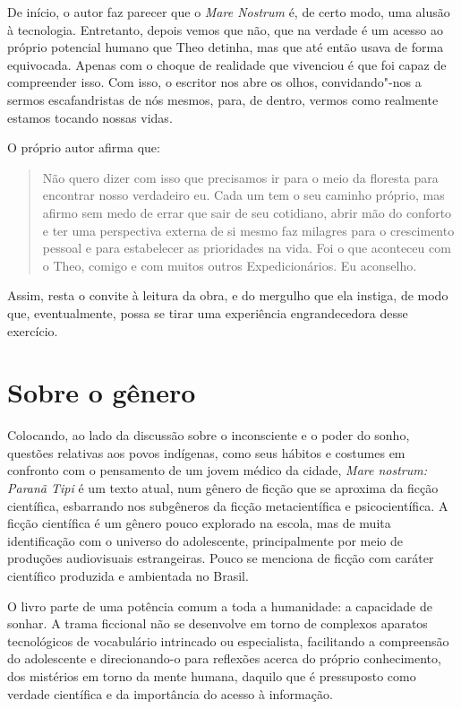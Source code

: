 De início, o autor faz parecer que o \textit{Mare Nostrum} é, de certo modo, uma
alusão à tecnologia. Entretanto, depois vemos que não, que na verdade é
um acesso ao próprio potencial humano que Theo detinha, mas que até
então usava de forma equivocada. Apenas com o choque de realidade que
vivenciou é que foi capaz de compreender isso. Com isso, o escritor nos
abre os olhos, convidando"-nos a sermos escafandristas de nós mesmos,
para, de dentro, vermos como realmente estamos tocando nossas vidas.

O próprio autor afirma que:

\begin{quote}
Não quero dizer com isso que precisamos ir para o meio da floresta para
encontrar nosso verdadeiro eu. Cada um tem o seu caminho próprio, mas
afirmo sem medo de errar que sair de seu cotidiano, abrir mão do
conforto e ter uma perspectiva externa de si mesmo faz milagres para o
crescimento pessoal e para estabelecer as prioridades na vida. Foi o que
aconteceu com o Theo, comigo e com muitos outros Expedicionários. Eu
aconselho.
\end{quote}

Assim, resta o convite à leitura da obra, e do mergulho que ela instiga,
de modo que, eventualmente, possa se tirar uma experiência
engrandecedora desse exercício.


\section{Sobre o gênero}

Colocando, ao lado da discussão sobre o inconsciente e o poder do sonho, questões relativas aos povos indígenas, como seus hábitos e costumes em confronto com o pensamento de um jovem médico da cidade, \emph{Mare nostrum: Paranã Tipi} é um texto atual, num gênero de ficção que se aproxima da ficção científica, esbarrando nos subgêneros da ficção metacientífica e psicocientífica. A ficção científica é um gênero pouco explorado na escola, mas de muita identificação com o universo do adolescente, principalmente por meio de produções audiovisuais estrangeiras. Pouco se menciona de ficção com caráter científico produzida e ambientada no Brasil.

O livro parte de uma potência comum a toda a humanidade: a capacidade de sonhar. A trama ficcional não se desenvolve em torno de complexos aparatos tecnológicos de vocabulário intrincado ou especialista, facilitando a compreensão do adolescente e direcionando-o para reflexões acerca do próprio conhecimento, dos mistérios em torno da mente humana, daquilo que é pressuposto como verdade científica e da importância do acesso à informação. 

